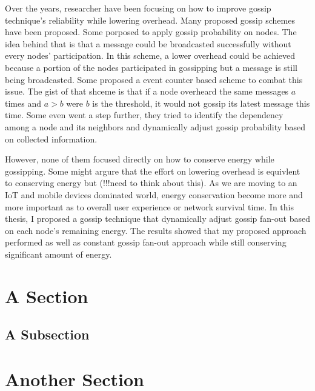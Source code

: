Over the years, researcher have been focusing on how to improve gossip technique's reliability while lowering overhead. Many proposed gossip schemes have been proposed. Some porposed to apply gossip probability on nodes. The idea behind that is that a message could be broadcasted successfully without every nodes' participation. In this scheme, a lower overhead could be achieved because a portion of the nodes participated in gossipping but a message is still being broadcasted. Some proposed a event counter based scheme to combat this issue. The gist of that shceme is that if a node overheard the same messages $a$ times and $a > b$ were $b$ is the threshold, it would not gossip its latest message this time. Some even went a step further, they tried to identify the dependency among a node and its neighbors and dynamically adjust gossip probability based on collected information.

However, none of them focused directly on how to conserve energy while gossipping. Some might argure that the effort on lowering overhead is equivlent to conserving energy but (!!!need to think about this). As we are moving to an IoT and mobile devices dominated world, energy conservation become more and more important as to overall user experience or network survival time. In this thesis, I proposed a gossip technique that dynamically adjust gossip fan-out based on each node's remaining energy. The results showed that my proposed approach performed as well as constant gossip fan-out approach while still conserving significant amount of energy.






\section{A Section}


\subsection{A Subsection}


\section{Another Section}
